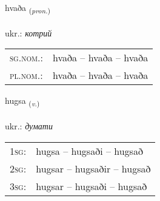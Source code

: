 \documentclass[frontgrid, backgrid]{flacards}\usepackage[]{graphicx}\usepackage[]{xcolor}
\begin{document}
{hvaða \small{\textsubscript{(\textit{pron.})}} \\[1ex] %
\textphonetic{[kʰvaːða]} \\
ukr.: \emph{котрий} \\  [2ex]
\renewcommand*{\arraystretch}{0.8}
\begin{tabular}{ll}
\textsc{sg.nom.}: & hvaða  --  hvaða -- hvaða \\ 
\textsc{pl.nom.}: & hvaða -- hvaða -- hvaða
\end{tabular}
}

\renewcommand{\flhead}{\vskip5pt \fboxsep=0pt {\small\bfseries\footnotesize Sagnorð | дієслово}}
\renewcommand{\fcfoot}{\vskip5pt \fboxsep=0pt \hspace{2pt}{\small\bfseries\footnotesize 1K}}

\renewcommand{\blhead}{\vskip5pt {\small\bfseries\footnotesize Sagnorð | дієслово }}
\renewcommand{\bcfoot}{\vskip5pt \hspace{2pt}{\small\bfseries\footnotesize 1K}}


{hugsa \small{\textsubscript{(\textit{v.})}} \\[1ex] %
\textphonetic{[hʏksa]} \\
ukr.: \emph{думати} \\  [2ex]
\renewcommand*{\arraystretch}{0.8}
\begin{tabular}{p{1cm}l}
\textsc{1sg}: & hugsa -- hugsaði -- hugsað \\ 
\textsc{2sg}: & hugsar -- hugsaðir -- hugsað \\ 
\textsc{3sg}: & hugsar -- hugsaði -- hugsað \\ 
\end{tabular}
}

\renewcommand{\flhead}{\vskip5pt \fboxsep=0pt {\small\bfseries\footnotesize Sagnorð | дієслово}}
\renewcommand{\fcfoot}{\vskip5pt \fboxsep=0pt \hspace{2pt}{\small\bfseries\footnotesize 1K}}

\renewcommand{\blhead}{\vskip5pt {\small\bfseries\footnotesize Sagnorð | дієслово }}
\renewcommand{\bcfoot}{\vskip5pt \hspace{2pt}{\small\bfseries\footnotesize 1K}}
\end{document}
